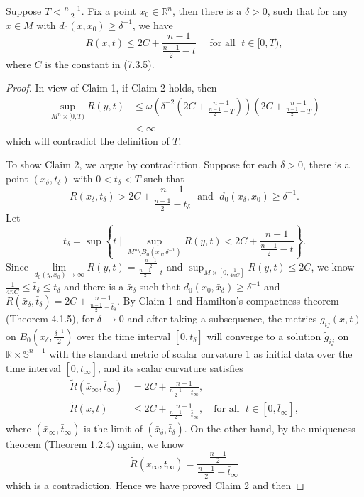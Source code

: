 \begin{lemma}
  \label{lem:cz-standard-solution-maximal-time-curvature-blowup}
Suppose $T<\frac{n-1}{2}$. Fix a point $x_{0}\in
\mathbb{R}^{n} $, then there is a $\delta>0$, such that for any
$x\in M$ with $d_{0}(x,x_{0})\geq \delta^{-1}$, we have
$$
R(x,t)\leq 2C+\frac{n-1}{\frac{n-1}{2}-t}\quad \text{ for all }\;
t\in[0,T),
$$
where $C$ is the constant in (7.3.5).
\end{lemma}
\begin{proof}
In view of Claim 1, if Claim 2 holds, then
\begin{align*}
\sup_{M^{n}\times[0,T)}R(y,t) &  \leq
\omega\left(\delta^{-2}\left(2C+\frac{n-1}{\frac{n-1}{2}-T}\right)\right)
\left(2C+\frac{n-1}{\frac{n-1}{2}-T}\right)\\
&  < \infty
\end{align*}
which will contradict the definition of $T$.

To show Claim 2, we argue by contradiction. Suppose for each
$\delta>0$, there is a point $(x_{\delta},t_{\delta})$ with
$0<t_{\delta}<T $ such that
$$
R(x_{\delta},t_{\delta})>2C+\frac{n-1}{\frac{n-1}{2}-t_{\delta}}\;
\mbox{ and }\; d_{0}(x_{\delta},x_{0})\geq \delta^{-1}.
$$
Let
$$
\bar{t}_{\delta}=\sup\left\{t\; \Big|\; \sup_{M^{n} \setminus
B_{0}(x_{0},\delta^{-1})}
R(y,t)<2C+\frac{n-1}{\frac{n-1}{2}-t}\right\}.
$$
Since $\lim\limits_{d_{0}(y,x_{0})\rightarrow\infty}R(y,t)
=\frac{\frac{n-1}{2}}{\frac{n-1}{2}-t}$ and
$\sup_{M\times[0,\frac{1}{4nC}]}R(y,t)\leq 2C$, we know
$\frac{1}{4nC}\leq \bar{t}_{\delta}\leq t_{\delta}$ and there is a
$\bar{x}_{\delta}$ such that
$d_{0}(x_{0},\bar{x}_{\delta})\geq\delta^{-1}$ and
$R(\bar{x}_{\delta},\bar{t}_{\delta})
=2C+\frac{n-1}{\frac{n-1}{2}-\bar{t}_{\delta}}.$ By Claim 1 and
Hamilton's compactness theorem (Theorem 4.1.5), for $\delta\
\rightarrow 0$ and after taking a subsequence, the metrics
$g_{ij}(x,t)$ on $B_{0}(\bar{x}_{\delta},\frac{\delta^{-1}}{2})$
over the time interval $[0,\bar{t}_{\delta}]$ will converge to a
solution $\tilde{g}_{ij}$ on $\mathbb{R}\times \mathbb{S}^{n-1}$
with the standard metric of scalar curvature 1 as initial data
over the time interval $[0,\bar{t}_{\infty}]$, and its scalar
curvature satisfies
\begin{align*}
\tilde{R}(\bar{x}_{\infty},\bar{t}_{\infty})
&  = 2C+\frac{n-1}{\frac{n-1}{2}-\bar{t}_{\infty}},\\
\tilde{R}(x,t)&  \leqslant
2C+\frac{n-1}{\frac{n-1}{2}-\bar{t}_{\infty}},
 \quad \mbox{for all }\;  t\in [0,\bar{t}_{\infty}],
\end{align*}
where $(\bar{x}_{\infty},\bar{t}_{\infty})$ is the limit of
$(\bar{x}_{\delta},\bar{t}_{\delta})$. On the other hand, by the
uniqueness theorem (Theorem 1.2.4) again, we know
$$
\tilde{R}(\bar{x}_{\infty},\bar{t}_{\infty})
=\frac{\frac{n-1}{2}}{\frac{n-1}{2}-\bar{t}_{\infty}}
$$
which is a contradiction.  Hence we have proved Claim 2 and then
\end{proof}

